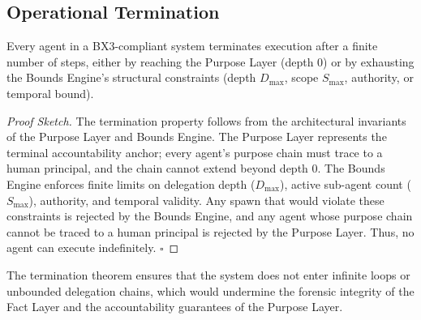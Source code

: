 \subsection{Operational Termination}

\begin{theorem}\label{th:termination}
Every agent in a BX3-compliant system terminates execution after a finite number of steps, either by reaching the Purpose Layer (depth 0) or by exhausting the Bounds Engine's structural constraints (depth $D_{\max}$, scope $S_{\max}$, authority, or temporal bound).
\end{theorem}

\begin{proof}[Proof Sketch]
The termination property follows from the architectural invariants of the Purpose Layer and Bounds Engine. The Purpose Layer represents the terminal accountability anchor; every agent's purpose chain must trace to a human principal, and the chain cannot extend beyond depth 0. The Bounds Engine enforces finite limits on delegation depth ($D_{\max}$), active sub-agent count ($S_{\max}$), authority, and temporal validity. Any spawn that would violate these constraints is rejected by the Bounds Engine, and any agent whose purpose chain cannot be traced to a human principal is rejected by the Purpose Layer. Thus, no agent can execute indefinitely. $\square$
\end{proof}

The termination theorem ensures that the system does not enter infinite loops or unbounded delegation chains, which would undermine the forensic integrity of the Fact Layer and the accountability guarantees of the Purpose Layer.